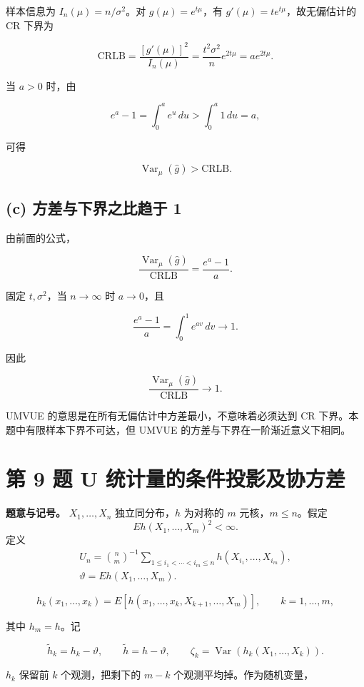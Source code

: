 样本信息为 $I_n(\mu)=n/\sigma^2$。对 $g(\mu)=e^{t\mu}$，有 $g'(\mu)=te^{t\mu}$，故无偏估计的 CR 下界为

\[
\mathrm{CRLB}
=\frac{[g'(\mu)]^2}{I_n(\mu)}
=\frac{t^2\sigma^2}{n}e^{2t\mu}
=ae^{2t\mu}.
\]

当 $a>0$ 时，由

\[
e^a-1=\int_0^a e^u\,du>\int_0^a1\,du=a,
\]

可得

\[
\boxed{\operatorname{Var}_\mu(\widehat g)>\mathrm{CRLB}.}
\]

\subsection{(c) 方差与下界之比趋于 1}

由前面的公式，

\[
\frac{\operatorname{Var}_\mu(\widehat g)}{\mathrm{CRLB}}
=\frac{e^a-1}{a}.
\]

固定 $t,\sigma^2$，当 $n\to\infty$ 时 $a\to0$，且

\[
\frac{e^a-1}{a}
=\int_0^1 e^{av}\,dv\to1.
\]

因此

\[
\boxed{
\frac{\operatorname{Var}_\mu(\widehat g)}{\mathrm{CRLB}}\longrightarrow1.}
\]

 UMVUE 的意思是在所有无偏估计中方差最小，不意味着必须达到 CR 下界。本题中有限样本下界不可达，但 UMVUE 的方差与下界在一阶渐近意义下相同。

\section{第 9 题 U 统计量的条件投影及协方差}

\textbf{题意与记号。} $X_1,\ldots,X_n$ 独立同分布，$h$ 为对称的 $m$ 元核，$m\le n$。假定
\[
 E h(X_1,\ldots,X_m)^2<\infty.
\]
定义
\[
\begin{gathered}
 U_n=\binom nm^{-1}\sum_{1\le i_1<\cdots<i_m\le n}h(X_{i_1},\ldots,X_{i_m}),\\
 \vartheta=E h(X_1,\ldots,X_m).
\end{gathered}
\]

\[
h_k(x_1,\ldots,x_k)
=E[h(x_1,\ldots,x_k,X_{k+1},\ldots,X_m)],
\qquad k=1,\ldots,m,
\]

其中 $h_m=h$。记

\[
\widetilde h_k=h_k-\vartheta,\qquad
\widetilde h=h-\vartheta,\qquad
\zeta_k=\operatorname{Var}(h_k(X_1,\ldots,X_k)).
\]

 $h_k$ 保留前 $k$ 个观测，把剩下的 $m-k$ 个观测平均掉。作为随机变量，

